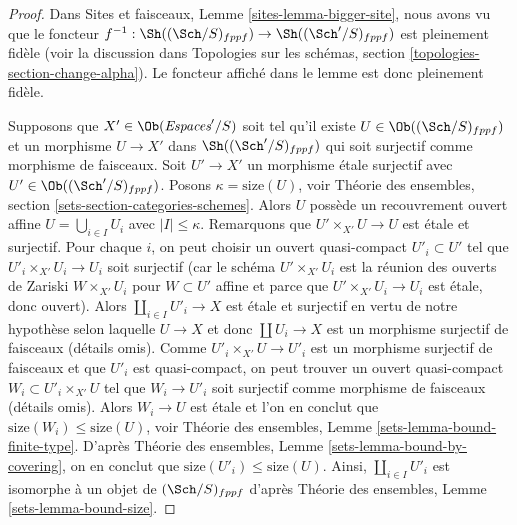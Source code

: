 \begin{proof}
Dans Sites et faisceaux, Lemme \ref{sites-lemma-bigger-site}, nous avons vu que le foncteur
$f^{-1} : \Sh((\Sch/S)_{fppf}) \to \Sh((\Sch'/S)_{fppf})$
est pleinement fidèle (voir la discussion dans
Topologies sur les schémas, section \ref{topologies-section-change-alpha}).
Le foncteur affiché dans le lemme est donc pleinement fidèle.

\medskip\noindent
Supposons que $X' \in \Ob(\textit{Espaces}'/S)$ soit tel qu'il existe
$U \in \Ob((\Sch/S)_{fppf})$ et un morphisme $U \to X'$ dans
$\Sh((\Sch'/S)_{fppf})$ qui soit surjectif comme morphisme de faisceaux.
Soit $U' \to X'$ un morphisme \'etale surjectif avec
$U' \in \Ob((\Sch'/S)_{fppf})$. Posons $\kappa = \text{size}(U)$, voir
Théorie des ensembles, section \ref{sets-section-categories-schemes}.
Alors $U$ possède un recouvrement ouvert affine $U = \bigcup_{i \in I} U_i$
avec $|I| \leq \kappa$. Remarquons que $U' \times_{X'} U \to U$ est \'etale
et surjectif. Pour chaque $i$, on peut choisir un ouvert quasi-compact
$U'_i \subset U'$ tel que $U'_i \times_{X'} U_i \to U_i$
soit surjectif (car le schéma $U' \times_{X'} U_i$ est la
réunion des ouverts de Zariski $W \times_{X'} U_i$ pour $W \subset U'$
affine et parce que $U' \times_{X'} U_i \to U_i$ est \'etale, donc ouvert).
Alors $\coprod_{i \in I} U'_i \to X$ est \'etale et surjectif
en vertu de notre hypothèse selon laquelle $U \to X$ et donc $\coprod U_i \to X$
est un morphisme surjectif de faisceaux (détails omis).
Comme $U'_i \times_{X'} U \to U'_i$ est un morphisme surjectif de faisceaux
et que $U'_i$ est quasi-compact,
on peut trouver un ouvert quasi-compact $W_i \subset U'_i \times_{X'} U$
tel que $W_i \to U'_i$ soit surjectif comme morphisme de faisceaux
(détails omis). Alors $W_i \to U$ est \'etale et l'on en conclut
que $\text{size}(W_i) \leq \text{size}(U)$, voir
Théorie des ensembles, Lemme \ref{sets-lemma-bound-finite-type}. D'après
Théorie des ensembles, Lemme \ref{sets-lemma-bound-by-covering}, on en conclut
que $\text{size}(U'_i) \leq \text{size}(U)$.
Ainsi, $\coprod_{i \in I} U'_i$ est isomorphe à un objet de
$(\Sch/S)_{fppf}$ d'après Théorie des ensembles, Lemme \ref{sets-lemma-bound-size}.


\end{proof}
